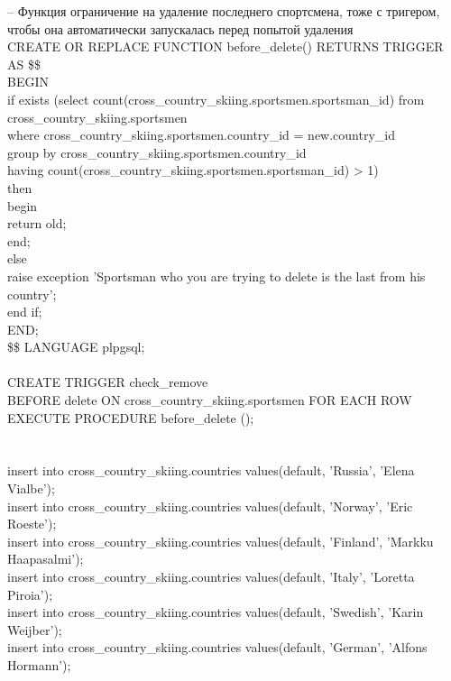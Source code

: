 \documentclass[a4paper,12pt]{article}
\begin{document}
-- Функция ограничение на удаление последнего спортсмена, тоже с тригером, чтобы она автоматически запускалась перед попытой удаления\\
CREATE OR REPLACE FUNCTION before\_delete() RETURNS TRIGGER AS \$\$\\
BEGIN\\
\indent if exists (select count(cross\_country\_skiing.sportsmen.sportsman\_id) from cross\_country\_skiing.sportsmen\\
\indent \indent where cross\_country\_skiing.sportsmen.country\_id = new.country\_id\\
\indent \indent group by cross\_country\_skiing.sportsmen.country\_id\\
\indent \indent having count(cross\_country\_skiing.sportsmen.sportsman\_id) > 1)\\
\indent \indent then\\
\indent \indent begin\\
\indent \indent \indent return old;\\
\indent \indent end;\\
\indent else\\
\indent \indent raise exception 'Sportsman who you are trying to delete is the last from his country';\\
\indent end if;\\
END;\\
\$\$ LANGUAGE plpgsql;\\
\\
CREATE TRIGGER check\_remove\\
BEFORE delete ON cross\_country\_skiing.sportsmen FOR EACH ROW EXECUTE PROCEDURE before\_delete ();\\
\\
\\
insert into cross\_country\_skiing.countries values(default, 'Russia', 'Elena Vialbe');\\
insert into cross\_country\_skiing.countries values(default, 'Norway', 'Eric Roeste');\\
insert into cross\_country\_skiing.countries values(default, 'Finland',  'Markku Haapasalmi');\\
insert into cross\_country\_skiing.countries values(default, 'Italy',  'Loretta Piroia');\\
insert into cross\_country\_skiing.countries values(default, 'Swedish',  'Karin Weijber');\\
insert into cross\_country\_skiing.countries values(default, 'German', 'Alfons Hormann');\\
\end{document}
